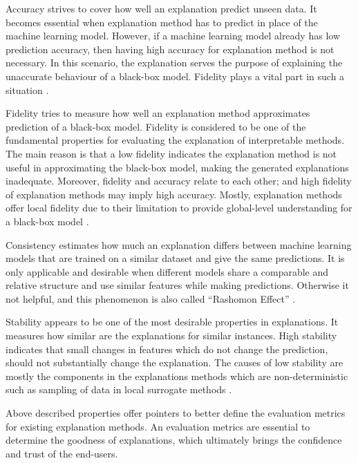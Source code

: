 \documentclass[english]{tktltiki2}
\theoremstyle{definition}
\theoremstyle{remark}
\begin{document}
Accuracy strives to cover how well an explanation predict unseen data. It becomes essential when explanation method has to predict in place of the machine learning model. However, if a machine learning model already has low prediction accuracy, then having high accuracy for explanation method is not necessary. In this scenario, the explanation serves the purpose of explaining the unaccurate behaviour of a black-box model. Fidelity plays a vital part in such a situation \citep{molnarinterpretable}.

Fidelity tries to measure how well an explanation method approximates prediction of a black-box model. Fidelity is considered to be one of the fundamental properties for evaluating the explanation of interpretable methods. The main reason is that a low fidelity indicates the explanation method is not useful in approximating the black-box model, making the generated explanations inadequate. Moreover, fidelity and accuracy relate to each other; and high fidelity of explanation methods may imply high accuracy. Mostly, explanation methods offer local fidelity due to their limitation to provide global-level understanding for a black-box model \citep{molnarinterpretable}.

Consistency estimates how much an explanation differs between machine learning models that are trained on a similar dataset and give the same predictions. It is only applicable and desirable when different models share a comparable and relative structure and use similar features while making predictions. Otherwise it not helpful, and this phenomenon is also called “Rashomon Effect” \citep{molnarinterpretable}.

Stability appears to be one of the most desirable properties in explanations. It measures how similar are the explanations for similar instances. High stability indicates that small changes in features which do not change the prediction, should not substantially change the explanation. The causes of low stability are mostly the components in the explanations methods which are non-deterministic such as sampling of data in local surrogate methods \citep{molnarinterpretable}.

Above described properties offer pointers to better define the evaluation metrics for existing explanation methods. An evaluation metrics are essential to determine the goodness of explanations, which ultimately brings the confidence and trust of the end-users.
\end{document}
